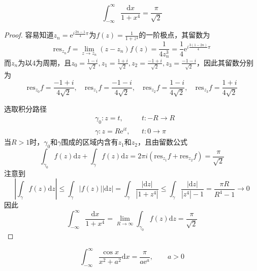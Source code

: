 \documentclass[lang = cn, scheme = chinese, thmcnt = section]{elegantbook}
\begin{document}
\begin{example}
	$$
	\int_{-\infty}^{\infty}{\frac{\mathrm{d}x}{1+x^4}}=\frac{\pi}{\sqrt{2}}
	$$
\end{example}

\begin{proof}
	容易知道$z_n=\mathrm{e}^{i\frac{2n-1}{4}\pi}$为$f(z)=\frac{1}{1+z^4}$的一阶极点，其留数为
	$$
	\mathrm{res}_{z_n}f=\lim_{z\to z_n}(z-z_n)f(z)=\frac{1}{4z_n^3}=\frac{1}{4}\mathrm{e}^{i\frac{3(1-2n)}{4}\pi}
	$$
	而$z_n$为以$4$为周期，且$z_0=\frac{1-i}{\sqrt{2}},z_1=\frac{1+i}{\sqrt{2}},z_2=\frac{-1+i}{\sqrt{2}},z_3=\frac{-1-i}{\sqrt{2}}$​，因此其留数分别为
	$$
	\mathrm{res}_{z_0}f=\frac{-1+i}{4\sqrt{2}},\quad 
	\mathrm{res}_{z_1}f=\frac{-1-i}{4\sqrt{2}},\quad 
	\mathrm{res}_{z_2}f=\frac{1-i}{4\sqrt{2}},\quad 
	\mathrm{res}_{z_3}f=\frac{1+i}{4\sqrt{2}}
	$$
	
	选取积分路径
	\begin{align*}
		& \gamma_0:z=t,&& t:-R\to R\\
		& \gamma:z=R\mathrm{e}^{it},&& t:0\to\pi
	\end{align*}
	当$R>1$时，$\gamma_0$和$\gamma$围成的区域内含有$z_1$和$z_2$，且由留数公式
	$$
	\int_{\gamma_0}{f(z)\mathrm{d}z}+\int_{\gamma}{f(z)\mathrm{d}z}=2\pi i (\mathrm{res}_{z_1}f+\mathrm{res}_{z_2}f)=\frac{\pi}{\sqrt{2}}
	$$
	注意到
	$$
	\left| \int_{\gamma}{f(z)\mathrm{d}z} \right|\le\int_\gamma{|f(z)||\mathrm{d}z|}
	=\int_\gamma\frac{|\mathrm{d}z|}{|1+z^4|}
	\le\int_\gamma\frac{|\mathrm{d}z|}{|z^4|-1}
	=\frac{\pi R}{R^4-1}\to0
	$$
	因此
	$$
	\int_{-\infty}^{\infty}{\frac{\mathrm{d}x}{1+x^4}}=\lim_{R\to\infty}\int_{\gamma_0}{f(z)\mathrm{d}z}=\frac{\pi}{\sqrt{2}}
	$$
\end{proof}

\begin{example}
	$$
	\int_{-\infty}^{\infty}\frac{\cos x}{x^2+a^2}\mathrm{d}x=\frac{\pi}{a\mathrm{e}^a},\qquad a>0
	$$
\end{example}
\end{document}
